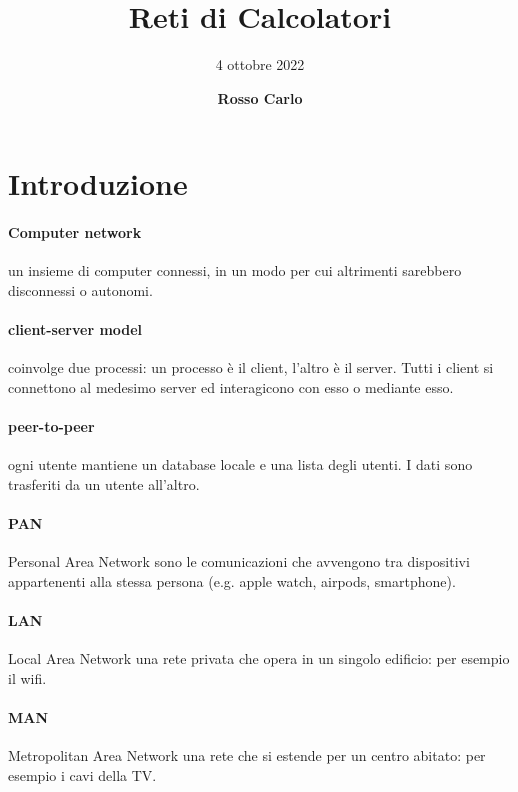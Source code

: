 \documentclass{article}
\title{\vspace{2cm}\textbf{Reti di Calcolatori}}
\author{\vspace{3mm}4 ottobre 2022}
\date{\vspace{3mm} \textbf{Rosso Carlo}}
\begin{document}
\begin{titlepage}
	\maketitle
	\thispagestyle{empty}
\end{titlepage}
\tableofcontents
\newpage

\section{Introduzione}
\paragraph{Computer network} un insieme di computer connessi, in un modo per cui
altrimenti sarebbero disconnessi o autonomi.

\paragraph{client-server model} coinvolge due processi: un processo è il client,
l'altro è il server. Tutti i client si connettono al medesimo server ed
interagicono con esso o mediante esso.

\paragraph{peer-to-peer} ogni utente mantiene un database locale e una lista
degli utenti. I dati sono trasferiti da un utente all'altro.

\paragraph{PAN} Personal Area Network sono le comunicazioni che avvengono tra
dispositivi appartenenti alla stessa persona (e.g. apple watch, airpods,
smartphone).

\paragraph{LAN} Local Area Network una rete privata che opera in un singolo
edificio: per esempio il wifi.

\paragraph{MAN} Metropolitan Area Network una rete che si estende per un centro
abitato: per esempio i cavi della TV.
\end{document}
